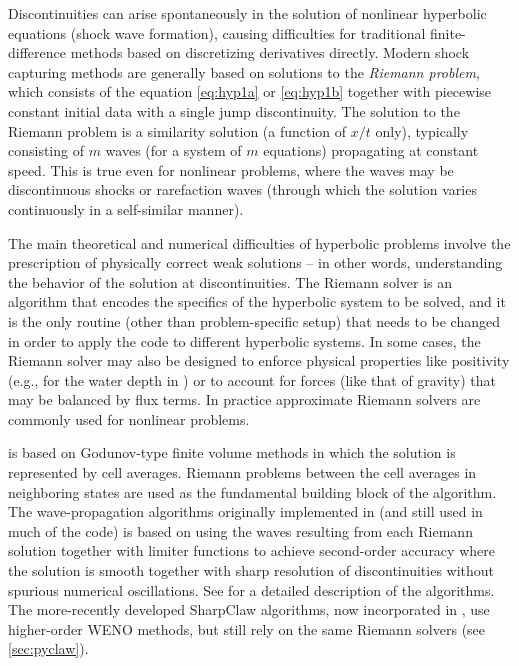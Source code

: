 
Discontinuities can arise spontaneously in the solution of nonlinear
hyperbolic equations (shock wave formation), causing difficulties for
traditional finite-difference methods based on discretizing derivatives
directly.   Modern shock capturing methods are generally based on solutions
to the {\em Riemann problem}, which consists of the equation 
\cref{eq:hyp1a} or \cref{eq:hyp1b}
together with piecewise constant initial data with a single jump discontinuity.
The solution to the Riemann problem is a similarity
solution (a function of $x/t$ only),
typically consisting of $m$ waves (for a system of $m$ equations)
propagating at constant speed.  This is true even for nonlinear problems,
where the waves may be discontinuous shocks or rarefaction waves
(through which the solution varies continuously in a self-similar manner).

The main theoretical
and numerical difficulties of hyperbolic problems involve the prescription of
physically correct weak solutions -- in other words, understanding the behavior
of the solution at discontinuities.  The Riemann solver is an algorithm that
encodes the specifics of the hyperbolic system to be solved, and it is the only
routine (other than problem-specific setup) that needs to be changed in order
to apply the code to different hyperbolic systems.  In some cases, the Riemann
solver may also be designed to enforce physical properties like positivity
(e.g., for the water depth in \geoclaw) or to account for forces (like that
of gravity) that may be balanced by flux terms.
In practice approximate Riemann solvers are commonly used for nonlinear
problems.%

\clawpack is based on Godunov-type finite volume methods in which
the solution is represented by cell averages.  Riemann problems
between the cell averages in neighboring states are used as the
fundamental building block of the algorithm.
The wave-propagation algorithms originally
implemented in \clawpack (and still used in much of the code) is based on
using the waves resulting from each Riemann solution together with limiter
functions to achieve second-order accuracy where the solution is smooth
together with sharp resolution of discontinuities without spurious numerical
oscillations. See \cite{rjl:fvmhp} for a detailed description of the
algorithms.   The more-recently developed SharpClaw algorithms,
now incorporated in
\pyclaw, use higher-order WENO methods, but still rely on the same Riemann
solvers (see \cref{sec:pyclaw}).  

